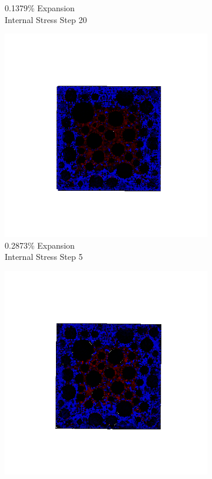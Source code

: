 \begin{figure}[ht!]
\begin{subfigure}{.25\textwidth}
      \caption{0.1379\% Expansion\\Internal Stress Step 20}
    \end{subfigure}

    \begin{subfigure}{.25\textwidth}
      \centering
      \includegraphics[width=1.0\linewidth]{Files/exp_3D/DEF/A30X0C_2_s5.png}
      \caption{0.2873\% Expansion\\Internal Stress Step 5}
    \end{subfigure}%
    \begin{subfigure}{.25\textwidth}
      \centering
      \includegraphics[width=1.0\linewidth]{Files/exp_3D/DEF/A30X0C_2_s10.png}

\end{subfigure}
\end{figure}
